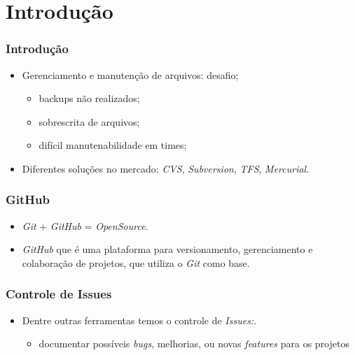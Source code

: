 \section[Introdução]{Introdução}

\begin{frame}
  \frametitle{Introdução}
  \begin{itemize}
    \item Gerenciamento e manutenção de arquivos: desafio;
          \begin{itemize}
            \item backups não realizados;
            \item sobrescrita de arquivos;
            \item difícil manutenabilidade em times;
          \end{itemize}
    \item Diferentes soluções no mercado: \textit{CVS}, \textit{Subversion}, \textit{TFS}, \textit{Mercurial}.
  \end{itemize}
\end{frame}

\begin{frame}
  \frametitle{GitHub}
  \begin{itemize}
    \item \textit{Git} + \textit{GitHub} = \textit{OpenSource}.
    \item \textit{GitHub} que é uma plataforma para versionamento, gerenciamento e colaboração de projetos, que utiliza o \textit{Git} como base. \cite{Scott:ProGit}
  \end{itemize}
\end{frame}

\begin{frame}
  \frametitle{Controle de Issues}
  \begin{itemize}
    \item Dentre outras ferramentas temos o controle de \textit{Issues:}.
          \begin{itemize}
            \item documentar possíveis \textit{bugs}, melhorias, ou novas \textit{features} para os projetos
          \end{itemize}
  \end{itemize}
\end{frame}

